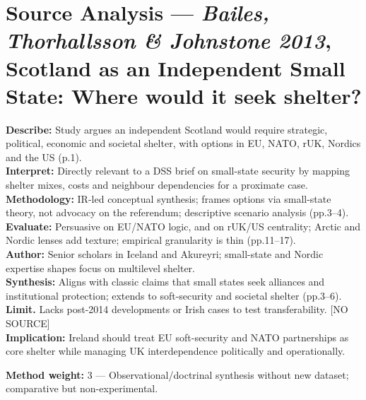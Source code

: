 \section*{Source Analysis — \textit{Bailes, Thorhallsson \& Johnstone 2013}, Scotland as an Independent Small State: Where would it seek shelter?}
\textbf{Describe:} Study argues an independent Scotland would require strategic, political, economic and societal shelter, with options in EU, NATO, rUK, Nordics and the US (p.1).\\
\textbf{Interpret:} Directly relevant to a DSS brief on small-state security by mapping shelter mixes, costs and neighbour dependencies for a proximate case.\\
\textbf{Methodology:} IR-led conceptual synthesis; frames options via small-state theory, not advocacy on the referendum; descriptive scenario analysis (pp.3–4).\\
\textbf{Evaluate:} Persuasive on EU/NATO logic, and on rUK/US centrality; Arctic and Nordic lenses add texture; empirical granularity is thin (pp.11–17).\\
\textbf{Author:} Senior scholars in Iceland and Akureyri; small-state and Nordic expertise shapes focus on multilevel shelter.\\
\textbf{Synthesis:} Aligns with classic claims that small states seek alliances and institutional protection; extends to soft-security and societal shelter (pp.3–6).\\
\textbf{Limit.} Lacks post-2014 developments or Irish cases to test transferability. [NO SOURCE]\\
\textbf{Implication:} Ireland should treat EU soft-security and NATO partnerships as core shelter while managing UK interdependence politically and operationally.

\textbf{Method weight:} 3 — Observational/doctrinal synthesis without new dataset; comparative but non-experimental.

